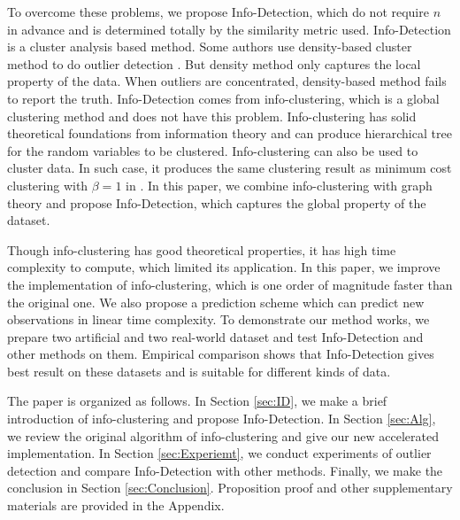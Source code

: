 \documentclass[runningheads]{llncs}
\begin{document}
To overcome these problems, we propose Info-Detection, which do not require $n$ in advance and is determined totally by the similarity metric used.  
Info-Detection is a cluster analysis based method. Some authors use density-based cluster method to do outlier detection \cite{Campello}. But density method only captures the local property of the data. When outliers are concentrated, density-based method fails to report the truth. Info-Detection comes from info-clustering, which is a global clustering method \cite{RN1} and does not have this problem. Info-clustering has solid theoretical foundations from information theory and can produce hierarchical tree for the random variables to be clustered. Info-clustering can also be used to cluster data. In such case, it produces the same clustering result as minimum cost clustering with $\beta = 1$ in \cite{RN7}. In this paper, we combine info-clustering with graph theory and propose Info-Detection, which captures the global property of the dataset.  

Though info-clustering has good theoretical properties, it has high time complexity to compute, which limited its application. In this paper, we improve the implementation of info-clustering, which is one order of magnitude faster than the original one. We also propose a prediction scheme which can predict new observations in linear time complexity. To demonstrate our method works, we prepare two artificial and two real-world dataset and test Info-Detection and other methods on them. Empirical comparison shows that Info-Detection gives best result on these datasets and is suitable for different kinds of data.

The paper is organized as follows. In Section \ref{sec:ID}, we make a brief introduction of info-clustering and propose Info-Detection. In Section \ref{sec:Alg}, we review the original algorithm of info-clustering and give our new accelerated implementation. In Section \ref{sec:Experiemt}, we conduct experiments of outlier detection and compare Info-Detection with other methods. Finally, we make the conclusion in Section \ref{sec:Conclusion}. Proposition proof and other supplementary materials are provided in the Appendix.
\end{document}
